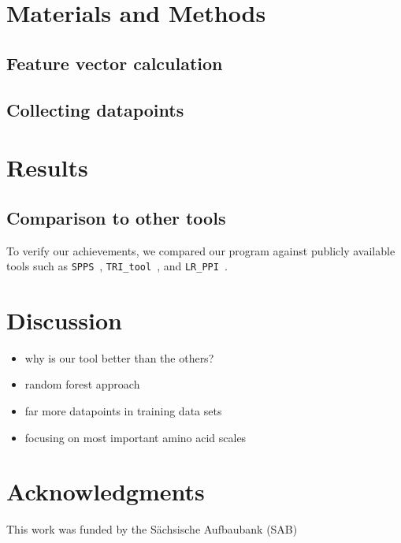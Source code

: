 \documentclass[preprint,3p,times,twocolumn]{elsarticle}
\newcommand{\spps}{\texttt{SPPS}}
\newcommand{\tri}{\texttt{TRI\_tool}}
\newcommand{\lr}{\texttt{LR\_PPI}}
\begin{document}

\section{Materials and Methods}
\subsection{Feature vector calculation}

\subsection{Collecting datapoints}


\section{Results}
%

\subsection{Comparison to other tools}
To verify our achievements, we compared our program against publicly available tools such as \spps\ \cite{Liu:2012}, \tri\ \cite{Perovic:2017}, and \lr\ \cite{Pan:2010}.

\section{Discussion}
\begin{itemize}
\item why is our tool better than the others?
\item random forest approach
\item far more datapoints in training data sets
\item focusing on most important amino acid scales
\end{itemize}


\section*{Acknowledgments}

This work was funded by the S\"achsische Aufbaubank (SAB)



\end{document}
